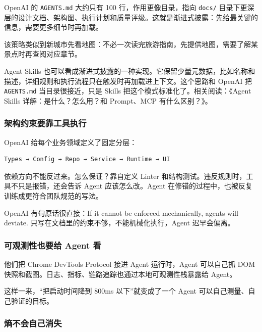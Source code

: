 \documentclass[9pt,a4paper,twocolumn]{ctexart}
\begin{document}
OpenAI 的 \texttt{AGENTS.md} 大约只有 100 行，作用更像目录，指向 \texttt{docs/} 目录下更深层的设计文档、架构图、执行计划和质量评级。这就是渐进式披露：先给最关键的信息，需要更多细节时再加载。



该策略类似到新城市先看地图：不必一次读完旅游指南，先提供地图，需要了解某景点时再查阅对应章节。



Agent Skills 也可以看成渐进式披露的一种实现。它保留少量元数据，比如名称和描述，详细规则和执行流程只在触发时再加载进上下文。这个思路和 OpenAI 把 \texttt{AGENTS.md} 当目录很接近，只是 Skills 把这个模式标准化了。相关阅读：《Agent Skills 详解：是什么？怎么用？和 Prompt、MCP 有什么区别？》。



\subsubsection{架构约束要靠工具执行}


OpenAI 给每个业务领域定义了固定分层：



\begin{lstlisting}
Types → Config → Repo → Service → Runtime → UI
\end{lstlisting}



依赖方向不能反过来。怎么保证？靠自定义 Linter 和结构测试。违反规则时，工具不只是报错，还会告诉 Agent 应该怎么改。Agent 在修错的过程中，也被反复训练成更符合团队规范的写法。



OpenAI 有句原话很直接：If it cannot be enforced mechanically, agents will deviate. 只写在文档里的约束不够，不能机械化执行，Agent 迟早会偏离。



\subsubsection{可观测性也要给 Agent 看}


他们把 Chrome DevTools Protocol 接进 Agent 运行时，Agent 可以自己抓 DOM 快照和截图。日志、指标、链路追踪也通过本地可观测性栈暴露给 Agent。



这样一来，“把启动时间降到 800ms 以下”就变成了一个 Agent 可以自己测量、自己验证的目标。



\subsubsection{熵不会自己消失}
\end{document}
